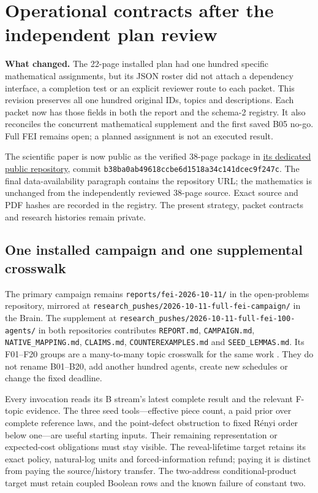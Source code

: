 \documentclass[11pt]{article}
\begin{document}
\section{Operational contracts after the independent plan review}\label{sec:operational}

\textbf{What changed.} The 22-page installed plan had one hundred specific mathematical assignments, but its JSON roster did not attach a dependency interface, a completion test or an explicit reviewer route to each packet. This revision preserves all one hundred original IDs, topics and descriptions. Each packet now has those fields in both the report and the schema-2 registry. It also reconciles the concurrent mathematical supplement and the first saved B05 no-go. Full FEI remains open; a planned assignment is not an executed result.

The scientific paper is now public as the verified 38-page package in \href{https://github.com/yspennstate/fourier-entropy-threshold-functions}{its dedicated public repository}, commit \nolinkurl{b38ba0ab49618ccbe6d1518a34c141dcec9f247c}. The final data-availability paragraph contains the repository URL; the mathematics is unchanged from the independently reviewed 38-page source. Exact source and PDF hashes are recorded in the registry. The present strategy, packet contracts and research histories remain private.

\subsection{One installed campaign and one supplemental crosswalk}

The primary campaign remains \texttt{reports/fei-2026-10-11/} in the open-problems repository, mirrored at \texttt{research\_pushes/2026-10-11-full-fei-campaign/} in the Brain. The supplement at \texttt{research\_pushes/2026-10-11-full-fei-100-agents/} in both repositories contributes \texttt{REPORT.md}, \texttt{CAMPAIGN.md}, \texttt{NATIVE\_MAPPING.md}, \texttt{CLAIMS.md}, \texttt{COUNTEREXAMPLES.md} and \texttt{SEED\_LEMMAS.md}. Its F01--F20 groups are a many-to-many topic crosswalk for the same work \cite{Supplement}. They do not rename B01--B20, add another hundred agents, create new schedules or change the fixed deadline.

Every invocation reads its B stream's latest complete result and the relevant F-topic evidence. The three seed tools---effective piece count, a paid prior over complete reference laws, and the point-defect obstruction to fixed R\'enyi order below one---are useful starting inputs. Their remaining representation or expected-cost obligations must stay visible. The reveal-lifetime target retains its exact policy, natural-log units and forced-information refund; paying it is distinct from paying the source/history transfer. The two-address conditional-product target must retain coupled Boolean rows and the known failure of constant two.
\end{document}
